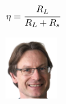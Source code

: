 

{\hfill$ \eta  = \cfrac{R_L}{R_L + R_s}$ \hfill}

\vspace{5mm}

\begin{center}
    \includegraphics[width = 0.15\textwidth]{img/huitre.png}
\end{center}

\hformbar


